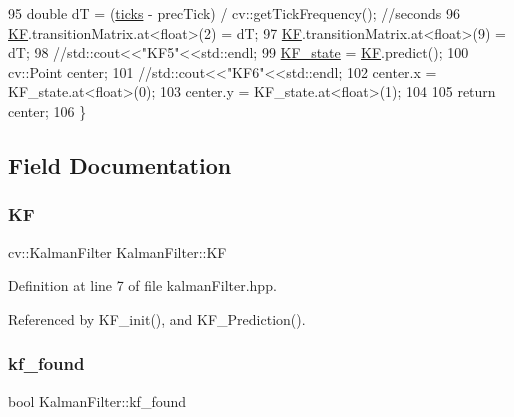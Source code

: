 \begin{DoxyCode}
95     \textcolor{keywordtype}{double} dT = (\hyperlink{class_kalman_filter_a9f9d6412ec56e87e78fe1de185bef4b8}{ticks} - precTick) / cv::getTickFrequency(); \textcolor{comment}{//seconds}
96     \hyperlink{class_kalman_filter_a486d5802080222974f49454c59b71d83}{KF}.transitionMatrix.at<\textcolor{keywordtype}{float}>(2) = dT;
97     \hyperlink{class_kalman_filter_a486d5802080222974f49454c59b71d83}{KF}.transitionMatrix.at<\textcolor{keywordtype}{float}>(9) = dT;
98     \textcolor{comment}{//std::cout<<"KF5"<<std::endl;}
99     \hyperlink{class_kalman_filter_a279304db3b9574783b2724ab2ed989af}{KF\_state} = \hyperlink{class_kalman_filter_a486d5802080222974f49454c59b71d83}{KF}.predict();
100     cv::Point center;
101     \textcolor{comment}{//std::cout<<"KF6"<<std::endl;}
102     center.x = KF\_state.at<\textcolor{keywordtype}{float}>(0);
103     center.y = KF\_state.at<\textcolor{keywordtype}{float}>(1);
104 
105     \textcolor{keywordflow}{return} center;
106 \}
\end{DoxyCode}


\subsection{Field Documentation}
\mbox{\label{class_kalman_filter_a486d5802080222974f49454c59b71d83}} 
\subsubsection{\texorpdfstring{KF}{KF}}
{\footnotesize\ttfamily cv\+::\+Kalman\+Filter Kalman\+Filter\+::\+KF\hspace{0.3cm}{\ttfamily [private]}}



Definition at line 7 of file kalman\+Filter.\+hpp.



Referenced by K\+F\+\_\+init(), and K\+F\+\_\+\+Prediction().

\mbox{\label{class_kalman_filter_a85ee09dd912c76ebcdbfa204153e28c1}} 
\subsubsection{\texorpdfstring{kf\+\_\+found}{kf\_found}}
{\footnotesize\ttfamily bool Kalman\+Filter\+::kf\+\_\+found\hspace{0.3cm}{\ttfamily [private]}}




